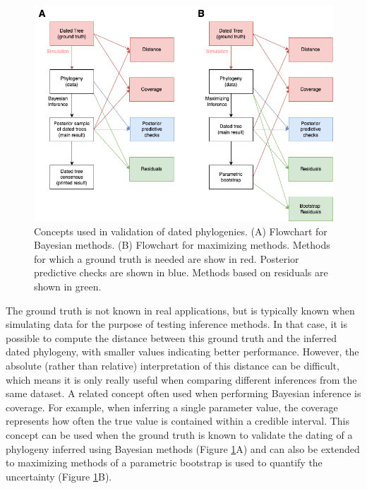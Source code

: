 \documentclass{article}
\begin{document}
 \begin{figure}[p!]
\begin{center}
\includegraphics[width=15cm]{flowchart.png}
\end{center}
\caption{Concepts used in validation of dated phylogenies. (A) Flowchart for Bayesian methods.
(B) Flowchart for maximizing methods. Methods for which a ground truth is needed are show in red.
Posterior predictive checks are shown in blue. Methods based on residuals are shown in green.
\label{fig:flowchart}}
\end{figure}
 
 The ground truth is not known in real applications, but is typically known when simulating
 data for the purpose of testing inference methods. In that case, 
 it is possible to compute the distance between this ground truth and
 the inferred dated phylogeny, with smaller values indicating better performance. 
 However, the absolute (rather than relative) 
 interpretation of this distance can be difficult, which means it is only really
 useful when comparing different inferences from the same dataset. 
A related concept often used when performing Bayesian inference is coverage.
For example, when inferring a single parameter value, the coverage represents
how often the true value is contained within a credible interval. This concept can be used
when the ground truth is known to validate the dating of a phylogeny inferred using
Bayesian methods (Figure \ref{fig:flowchart}A) and can also be extended to maximizing methods
of a parametric bootstrap \citep{efronBayesianInferenceParametric2012} is used to quantify the uncertainty 
(Figure \ref{fig:flowchart}B).
\end{document}
